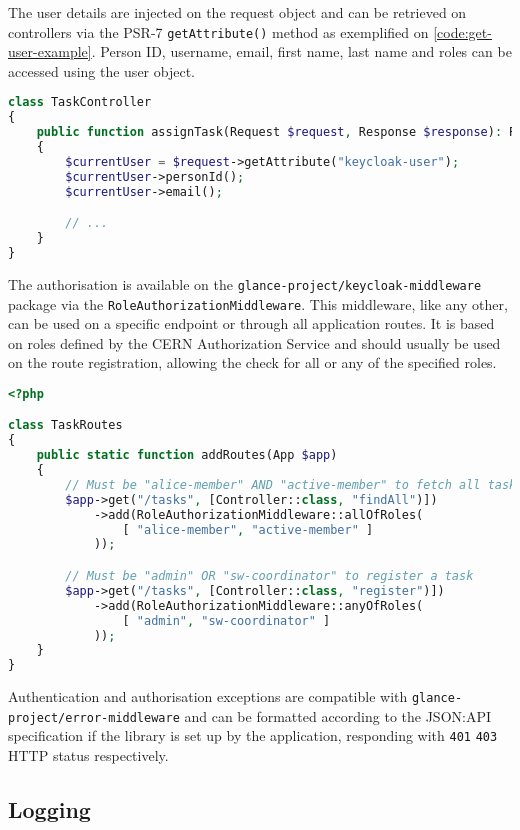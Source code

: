 The user details are injected on the request object and can be retrieved on controllers via the PSR-7 \texttt{getAttribute()} method as exemplified on \autoref{code:get-user-example}. Person ID, username, email, first name, last name and roles can be accessed using the user object.

\begin{lstlisting}[language=PHP,label={code:get-user-example},caption={Example of how the user object can be retrieve while using the Keycloak middleware.}]
class TaskController
{
	public function assignTask(Request $request, Response $response): Response
	{
		$currentUser = $request->getAttribute("keycloak-user");
		$currentUser->personId();
		$currentUser->email();

		// ...
	}
}
\end{lstlisting}

The authorisation is available on the \texttt{glance-project/keycloak-middleware} package via the \texttt{RoleAuthorizationMiddleware}. This middleware, like any other, can be used on a specific endpoint or through all application routes. It is based on roles defined by the CERN Authorization Service and should usually be used on the route registration, allowing the check for all or any of the specified roles.

\begin{lstlisting}[language=PHP,caption={Usage example of the Role Authorization Middleware.}]
<?php

class TaskRoutes 
{
	public static function addRoutes(App $app)
	{
		// Must be "alice-member" AND "active-member" to fetch all tasks
		$app->get("/tasks", [Controller::class, "findAll")])
			->add(RoleAuthorizationMiddleware::allOfRoles(
				[ "alice-member", "active-member" ]
			));

		// Must be "admin" OR "sw-coordinator" to register a task
		$app->get("/tasks", [Controller::class, "register")])
			->add(RoleAuthorizationMiddleware::anyOfRoles(
				[ "admin", "sw-coordinator" ]
			));
	}
}
\end{lstlisting}

Authentication and authorisation exceptions are compatible with \texttt{glance-project/error-middleware} and can be formatted according to the JSON:API specification if the library is set up by the application, responding with \texttt{401} \texttt{403} HTTP status respectively. 

\subsection{Logging}

